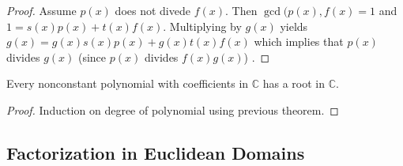 \documentclass[english,course]{lecture}
\newenvironment{hint}{\startimportant}{}
\def\startimportant#1\end{[{Hint:} #1]\end}
\theoremstyle{plain}
\def\C{{\mathbb C}}
\def\presnotes{}
\begin{document}
\begin{proof}
	Assume $p(x)$ does not divede $f(x)$. Then $\gcd(p(x),f(x)=1$ and $1=s(x)p(x)+t(x)f(x)$. Multiplying by $g(x)$ yields $g(x)=g(x)s(x)p(x)+g(x)t(x)f(x)$ which implies that $p(x)$ divides $g(x)$ (since $p(x)$ divides $f(x)g(x)$) .
\end{proof}

\presnotes










\begin{unnumberedtheorem}
	Every nonconstant polynomial with coefficients in $\C$ has a root in $\C$.
\end{unnumberedtheorem}



\begin{proof}
	Induction on degree of polynomial using previous theorem.
\end{proof}

\presnotes





\subsection{Factorization in Euclidean Domains}\label{SubSec-Factorization-in-Euclidean-Domains}
\end{document}

